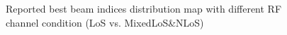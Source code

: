 \documentclass[conference, 10pt]{IEEEtran}
\begin{document}
\begin{figure}[t]
\begin{center}
{	%
		\label{fig:beam_map_cdf3}}
	\caption{Reported best beam indices distribution map \label{fig:leapperf} with different RF channel condition (LoS vs. MixedLoS\&NLoS)}
	\end{center}
	\end{figure}
\end{document}
